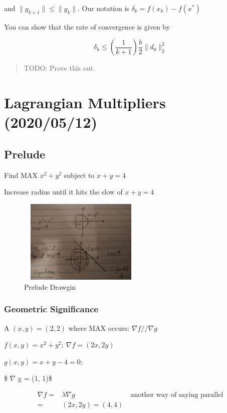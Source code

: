 \documentclass[11pt]{article}
\begin{document}
and \(\|g_{k + 1}\| \leq \|g_k\|\). Our notation is \(\delta_k = f(x_k) - f(x^*)\)

You can show that the rate of convergence is given by

$$
\delta_k \leq (\frac{1}{k + 1}) \frac{b}{2} \|d_0\|_2^2
$$

\begin{quote}
TODO: Prove this out.
\end{quote}

\section{Lagrangian Multipliers (2020/05/12)}
\label{sec:orgf2e5e2e}
\subsection{Prelude}
\label{sec:org333c3b3}

Find MAX \(x^2 + y^2\) subject to \(x + y = 4\)

Increase radius until it hits the slow of \(x + y = 4\)

\begin{figure}[htbp]
\centering
\includegraphics[width=6cm,height=4cm]{./resources/lagrangian_prelude.jpg}
\caption{\label{fig:org117831d}Prelude Drawgin}
\end{figure}

\subsubsection{Geometric Significance}
\label{sec:orgeffea85}

A \((x, y) = (2, 2)\) where MAX occurs: \(\nabla f // \nabla g\)

\(f(x, y) = x^2 + y^2; \ \nabla f = (2x, 2y)\)

\(g(x, y) = x + y - 4 = 0;\)

\$ \(\nabla\) g = (1, 1)\$

\begin{equation}
\begin{split}
\nabla f = & \lambda \nabla g & \ \text{another way of saying parallel}\\
= & (2x, 2y) = (4, 4)
\end{split}
\end{equation}
\end{document}
